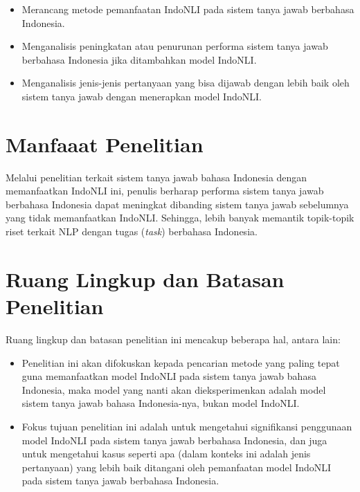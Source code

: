 \begin{itemize}

    \item Merancang metode pemanfaatan IndoNLI pada sistem tanya jawab berbahasa Indonesia.

    \item Menganalisis peningkatan atau penurunan performa sistem tanya jawab berbahasa Indonesia jika ditambahkan model IndoNLI.

    \item Menganalisis jenis-jenis pertanyaan yang bisa dijawab dengan lebih baik oleh sistem tanya jawab dengan menerapkan model IndoNLI.
    
\end{itemize}

\section{Manfaaat Penelitian}
Melalui penelitian terkait sistem tanya jawab bahasa Indonesia dengan memanfaatkan IndoNLI ini, penulis berharap performa sistem tanya jawab berbahasa Indonesia dapat meningkat dibanding sistem tanya jawab sebelumnya yang tidak memanfaatkan IndoNLI. Sehingga, lebih banyak memantik topik-topik riset terkait NLP dengan tugas (\emph{task}) berbahasa Indonesia.

\section{Ruang Lingkup dan Batasan Penelitian}
Ruang lingkup dan batasan penelitian ini mencakup beberapa hal, antara lain:

\begin{itemize}

    \item Penelitian ini akan difokuskan kepada pencarian metode yang paling tepat guna memanfaatkan model IndoNLI pada sistem tanya jawab bahasa Indonesia, maka model yang nanti akan dieksperimenkan adalah model sistem tanya jawab bahasa Indonesia-nya, bukan model IndoNLI.

    \item Fokus tujuan penelitian ini adalah untuk mengetahui signifikansi penggunaan model IndoNLI pada sistem tanya jawab berbahasa Indonesia, dan juga untuk mengetahui kasus seperti apa (dalam konteks ini adalah jenis pertanyaan) yang lebih baik ditangani oleh pemanfaatan model IndoNLI pada sistem tanya jawab berbahasa Indonesia.
    
\end{itemize}

